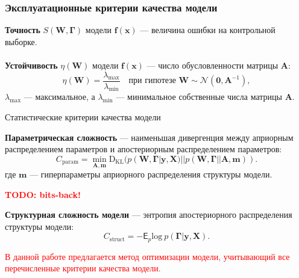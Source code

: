 \documentclass[usenames,dvipsnames,11pt,pdf,utf8,russian,aspectratio=169]{beamer}
\begin{document}
\begin{frame}
\frametitle{Эксплуатационные критерии качества модели}

\textbf{Точность} $S(\mathbf{W}, \boldsymbol{\Gamma})$ модели $\mathbf{f}(\mathbf{x})$ --- величина ошибки на контрольной выборке.
~\\
~\\
\textbf{Устойчивость} $\eta(\mathbf{{W}})$ модели $\mathbf{f}(\mathbf{x})$ --- число обусловленности матрицы $\mathbf{A}$:
$$\eta(\mathbf{{W}})=\frac{\lambda_{\max}}{\lambda_{\min}} \quad\text{при гипотезе } 	\mathbf{W} \sim \mathcal{N}(\mathbf{0},\mathbf{A}^{-1}),$$  $\lambda_{\max}$ --- максимальное, а $\lambda_{\min}$ --- минимальное собственные числа матрицы $\mathbf{A}$.





\end{frame}

\begin{frame}{Статистические критерии качества модели}
\small


\textbf{Параметрическая сложность} --- наименьшая дивергенция между априорным распределением параметров и апостериорным распределением параметров:
\[
    C_\text{param} = \min_{\mathbf{A}, \mathbf{m}} \text{D}_\text{KL}(p(\mathbf{W}, \boldsymbol{\Gamma}|\mathbf{y}, \mathbf{X})||p(\mathbf{W}, \boldsymbol{\Gamma}||\mathbf{A}, \mathbf{m})).
\]
где $\mathbf{m}$ --- гиперпараметры априорного распределения структуры модели.

\textcolor{red}{\textbf{TODO: bits-back!\\}}

\textbf{Структурная сложность модели} --- энтропия апостериорного распределения структуры модели:
\[
    C_\text{struct} = -\mathsf{E}_{p} \text{log}~p(\boldsymbol{\Gamma}|\mathbf{y}, \mathbf{X}).
\]

\textcolor{red}{В данной работе предлагается метод оптимизации модели, учитывающий все перечисленные критерии качества модели. }
\end{frame}
\end{document}
